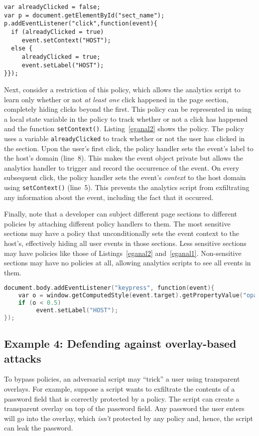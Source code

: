 \begin{lstlisting}[float,caption=Policy that only tracks whether a click
  happened or not,label=eganal2]
var alreadyClicked = false;
var p = document.getElementById("sect_name");
p.addEventListener("click",function(event){
  if (alreadyClicked = true) 
     event.setContext("HOST");
  else {
     alreadyClicked = true; 
     event.setLabel("HOST");
}});
\end{lstlisting}

Next, consider a restriction of this policy, which allows the
analytics script to learn only whether or not \emph{at least one}
click happened in the page section, completely hiding clicks beyond
the first. This policy can be represented in {\sys} using a local
state variable in the policy to track whether or not a click has
happened and the function \texttt{setContext()}. Listing~\ref{eganal2}
shows the policy. The policy uses a variable \texttt{alreadyClicked}
to track whether or not the user has clicked in the section. Upon the
user's first click, the policy handler sets the event's label to the
host's domain (line~8). This makes the event object private but allows
the analytics handler to trigger and record the occurrence of the
event. On every subsequent click, the policy handler sets the event's
\emph{context} to the host domain using \texttt{setContext()}
(line~5). This prevents the analytics script from exfiltrating any
information about the event, including the fact that it occurred.

Finally, note that a developer can subject different page sections to
different policies by attaching different policy handlers to them. The
most sensitive sections may have a policy that unconditionally sets
the event context to the host's, effectively hiding all user events in
those sections. Less sensitive sections may have policies like those
of Listings~\ref{eganal2} and~\ref{eganal1}. Non-sensitive sections
may have no policies at all, allowing analytics scripts to see all
events in them.

\begin{lstlisting}[float, caption=Example policy to prevent overlay-based
  stealing of keystrokes,label=overlay,language=C]
document.body.addEventListener("keypress", function(event){
    var o = window.getComputedStyle(event.target).getPropertyValue("opacity");
    if (o < 0.5) 
         event.setLabel("HOST");
});
\end{lstlisting}

\subsection{Example 4: Defending against overlay-based attacks}
To bypass {\sys} policies, an adversarial script may ``trick'' a user
using transparent overlays. For example, suppose a script wants to
exfiltrate the contents of a password field that is correctly
protected by a {\sys} policy. The script can create a transparent
overlay on top of the password field. Any password the user enters
will go into the overlay, which \emph{isn't} protected by any policy
and, hence, the script can leak the password.

